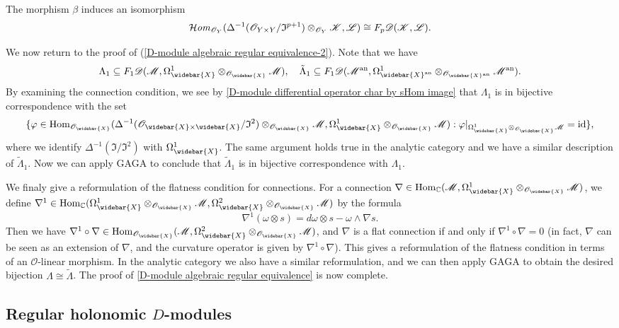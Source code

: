 \begin{lemma}\label{D-module differential operator char by sHom image}
The morphism $\beta$ induces an isomorphism
\[\operatorname{\mathcal{H}\hspace*{-0.4pt}\textit{om}\hspace{0.5pt}}_{\mathscr{O}_Y}(\Delta^{-1}(\mathscr{O}_{Y\times Y}/\mathfrak{I}^{p+1})\otimes_{\mathscr{O}_Y}\mathscr{K},\mathscr{L})\cong F_p\mathscr{D}(\mathscr{K},\mathscr{L}).\]
\end{lemma}
We now return to the proof of (\ref{D-module algebraic regular equivalence-2}). Note that we have
\[\Lambda_1\sub F_1\mathscr{D}(\mathscr{M},\Omega_{\widebar{X}}^1\otimes_{\mathscr{O}_{\widebar{X}}}\mathscr{M}),\quad \tilde{\Lambda}_1\sub F_1\mathscr{D}(\mathscr{M}^{\an},\Omega_{\widebar{X}^{\an}}^1\otimes_{\mathscr{O}_{\widebar{X}^{\an}}}\mathscr{M}^{\an}).\] 
By examining the connection condition, we see by \cref{D-module differential operator char by sHom image} that $\Lambda_1$ is in bijective correspondence with the set
\[\{\varphi\in\Hom_{\mathscr{O}_{\widebar{X}}}(\Delta^{-1}(\mathscr{O}_{\widebar{X}\times\widebar{X}}/\mathfrak{I}^2)\otimes_{\mathscr{O}_{\widebar{X}}}\mathscr{M},\Omega_{\widebar{X}}^1\otimes_{\mathscr{O}_{\widebar{X}}}\mathscr{M}):\varphi|_{\Omega_{\widebar{X}}^1\otimes_{\mathscr{O}_{\widebar{X}}}\mathscr{M}}=\id\},\]
where we identify $\Delta^{-1}(\mathfrak{I}/\mathfrak{I}^2)$ with $\Omega_{\widebar{X}}^1$. The same argument holds true in the analytic category and we have a similar description of $\tilde{\Lambda}_1$. Now we can apply GAGA to conclude that $\tilde{\Lambda}_1$ is in bijective correspondence with $\Lambda_1$.\par
We finaly give a reformulation of the flatness condition for connections. For a connection $\nabla\in\Hom_{\C}(\mathscr{M},\Omega_{\widebar{X}}^1\otimes_{\mathscr{O}_{\widebar{X}}}\mathscr{M})$, we define $\nabla^1\in\Hom_{\C}(\Omega_{\widebar{X}}^1\otimes_{\mathscr{O}_{\widebar{X}}}\mathscr{M},\Omega_{\widebar{X}}^2\otimes_{\mathscr{O}_{\widebar{X}}}\mathscr{M})$ by the formula
\[\nabla^1(\omega\otimes s)=d\omega\otimes s-\omega\wedge\nabla s.\] 
Then we have $\nabla^1\circ\nabla\in\Hom_{\mathscr{O}_{\widebar{X}}}(\mathscr{M},\Omega^2_{\widebar{X}}\otimes_{\mathscr{O}_{\widebar{X}}}\mathscr{M})$, and $\nabla$ is a flat connection if and only if $\nabla^1\circ\nabla=0$ (in fact, $\nabla$ can be seen as an extension of $\nabla$, and the curvature operator is given by $\nabla^1\circ\nabla$). This gives a reformulation of the flatness condition in terms of an $\mathscr{O}$-linear morphism. In the analytic category we also have a similar reformulation, and we can then apply GAGA to obtain the desired bijection $\Lambda\cong\tilde{\Lambda}$. The proof of \cref{D-module algebraic regular equivalence} is now complete.

\subsection{Regular holonomic \texorpdfstring{$D$}{D}-modules}